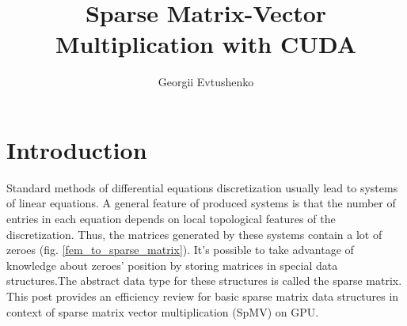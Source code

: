 \documentclass{article}
\begin{document}
\title{Sparse Matrix-Vector Multiplication with CUDA}
\author{Georgii Evtushenko}

\maketitle

\section{Introduction}

Standard methods of differential equations discretization usually lead to systems of linear equations. 
A general feature of produced systems is that the number of entries in each equation depends on local topological features of the discretization.
Thus, the matrices generated by these systems contain a lot of zeroes (fig. \ref{fem_to_sparse_matrix}). It's possible to take advantage of knowledge about zeroes' position by 
storing matrices in special data structures.The abstract data type for these structures is called the sparse matrix. 
This post provides an efficiency review for basic sparse matrix data structures in context of sparse matrix vector multiplication (SpMV) on GPU.
\end{document}
